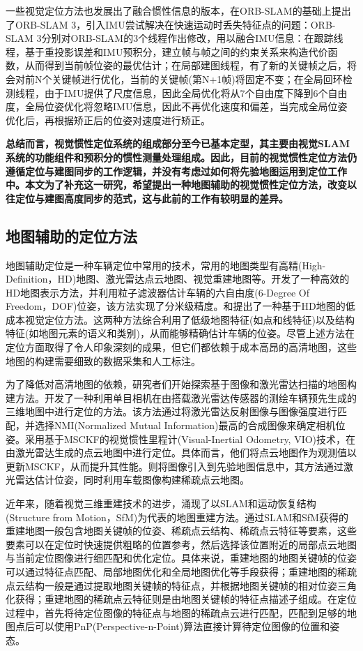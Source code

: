 一些视觉定位方法也发展出了融合惯性信息的版本，\citet{campos2021orb}在ORB-SLAM的基础上提出了ORB-SLAM 3，引入IMU尝试解决在快速运动时丢失特征点的问题：ORB-SLAM 3分别对ORB-SLAM的3个线程作出修改，用以融合IMU信息：在跟踪线程，基于重投影误差和IMU预积分，建立帧与帧之间的约束关系来构造代价函数，从而得到当前帧位姿的最优估计；在局部建图线程，有了新的关键帧之后，将会对前N个关键帧进行优化，当前的关键帧(第N+1帧)将固定不变；在全局回环检测线程，由于IMU提供了尺度信息，因此全局优化将从7个自由度下降到6个自由度，全局位姿优化将忽略IMU信息，因此不再优化速度和偏差，当完成全局位姿优化后，再根据矫正后的位姿对速度进行矫正。

\textbf{总结而言，视觉惯性定位系统的组成部分至今已基本定型，其主要由视觉SLAM系统的功能组件和预积分的惯性测量处理组成。因此，目前的视觉惯性定位方法仍遵循定位与建图同步的工作逻辑，并没有考虑过如何将先验地图运用到定位工作中。本文为了补充这一研究，希望提出一种地图辅助的视觉惯性定位方法，改变以往定位与建图高度同步的范式，这与此前的工作有较明显的差异。}

\subsection{地图辅助的定位方法}
地图辅助定位是一种车辆定位中常用的技术，常用的地图类型有高精(High-Definition，HD)地图、激光雷达点云地图、视觉重建地图等。\citet{jeong2020hdmi}开发了一种高效的HD地图表示方法，并利用粒子滤波器估计车辆的六自由度(6-Degree Of Freedom，DOF)位姿，该方法实现了分米级精度。\citet{xiao2020monocular}和\citet{guo2021coarse}提出了一种基于HD地图的低成本视觉定位方法。这两种方法综合利用了低级地图特征(如点和线特征)以及结构特征(如地图元素的语义和类别)，从而能够精确估计车辆的位姿。尽管上述方法在定位方面取得了令人印象深刻的成果，但它们都依赖于成本高昂的高清地图，这些地图的构建需要细致的数据采集和人工标注。

为了降低对高清地图的依赖，研究者们开始探索基于图像和激光雷达扫描的地图构建方法。\citet{stewart2012laps}开发了一种利用单目相机在由搭载激光雷达传感器的测绘车辆预先生成的三维地图中进行定位的方法。该方法通过将激光雷达反射图像与图像强度进行匹配，并选择NMI(Normalized Mutual Information)最高的合成图像来确定相机位姿。\citet{zuo2019visual}采用基于MSCKF的视觉惯性里程计(Visual-Inertial Odometry, VIO)技术，在由激光雷达生成的点云地图中进行定位。具体而言，他们将点云地图作为观测值以更新MSCKF，从而提升其性能。\citet{lin2021autonomous}则将图像引入到先验地图信息中，其方法通过激光雷达估计位姿，同时利用车载图像构建稀疏点云地图。

近年来，随着视觉三维重建技术的进步，涌现了以SLAM和运动恢复结构(Structure from Motion，SfM)\cite{schonberger2016structure}为代表的地图重建方法。通过SLAM和SfM获得的重建地图一般包含地图关键帧的位姿、稀疏点云结构、稀疏点云特征等要素，这些要素可以在定位时快速提供粗略的位置参考，然后选择该位置附近的局部点云地图与当前定位图像进行细匹配和优化定位。具体来说，重建地图的地图关键帧的位姿可以通过特征点匹配、局部地图优化和全局地图优化等手段获得；重建地图的稀疏点云结构一般是通过提取地图关键帧的特征点，并根据地图关键帧的相对位姿三角化获得；重建地图的稀疏点云特征则是由地图关键帧的特征点描述子组成。在定位过程中，首先将待定位图像的特征点与地图的稀疏点云进行匹配，匹配到足够的地图点后可以使用PnP(Perspective-n-Point)算法直接计算待定位图像的位置和姿态。

